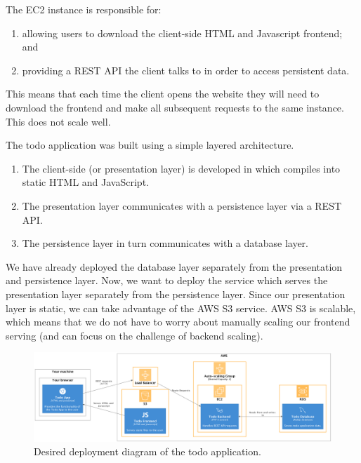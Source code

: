 \documentclass{csse4400}
\begin{document}

The EC2 instance is responsible for:
\begin{enumerate}
  \item allowing users to download the client-side HTML and Javascript frontend; and
  \item providing a REST API the client talks to in order to access persistent data.
\end{enumerate}
This means that each time the client opens the website they will need to download the frontend and make all subsequent requests to the same instance.
This does not scale well.

The todo application was built using a simple layered architecture.
\begin{enumerate}
  \item The client-side (or presentation layer) is developed in  which compiles into static HTML and JavaScript.
  \item The presentation layer communicates with a  persistence layer via a REST API.
  \item The persistence layer in turn communicates with a  database layer.
\end{enumerate}

We have already deployed the database layer separately from the presentation and persistence layer.
Now, we want to deploy the service which serves the presentation layer separately from the persistence layer.
Since our presentation layer is static,
we can take advantage of the AWS S3 service.
AWS S3 is scalable, which means that we do not have to worry about manually scaling our frontend serving (and can focus on the challenge of backend scaling).

\begin{figure}[ht]
\includegraphics[width=\textwidth]{diagrams/SimpleS3Deployment}
\caption{Desired deployment diagram of the todo application.}
\end{figure}
\end{document}
